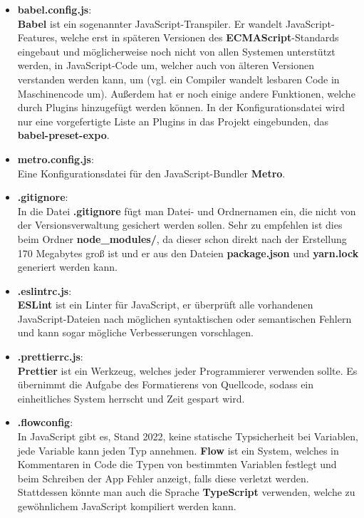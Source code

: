 \begin{itemize}
\item \textbf{babel.config.js}:\\
\textbf{Babel} ist ein sogenannter JavaScript-Transpiler. Er wandelt JavaScript-Features, welche erst in
späteren Versionen des \textbf{ECMAScript}-Standards eingebaut und möglicherweise noch nicht von allen
Systemen unterstützt werden, in JavaScript-Code um, welcher auch von älteren Versionen verstanden
werden kann, um (vgl. ein Compiler wandelt lesbaren Code in Maschinencode um). Außerdem hat er noch
einige andere Funktionen, welche durch Plugins hinzugefügt werden können. In der Konfigurationsdatei
wird nur eine vorgefertigte Liste an Plugins in das Projekt eingebunden, das \textbf{babel-preset-expo}.

\item \textbf{metro.config.js}:\\
Eine Konfigurationsdatei für den JavaScript-Bundler \textbf{Metro}.

\item \textbf{.gitignore}:\\
In die Datei \textbf{.gitignore} fügt man Datei- und Ordnernamen ein, die nicht von der Versionsverwaltung
gesichert werden sollen. Sehr zu empfehlen ist dies beim Ordner \textbf{node\_modules/}, da dieser schon
direkt nach der Erstellung 170 Megabytes groß ist und er aus den Dateien \textbf{package.json} und \textbf{yarn.lock}
generiert werden kann.

\item \textbf{.eslintrc.js}:\\
\textbf{ESLint} ist ein Linter für JavaScript, er überprüft alle vorhandenen JavaScript-Dateien nach
möglichen syntaktischen oder semantischen Fehlern und kann sogar mögliche Verbesserungen vorschlagen.

\item \textbf{.prettierrc.js}:\\
\textbf{Prettier} ist ein Werkzeug, welches jeder Programmierer verwenden sollte. Es übernimmt die Aufgabe
des Formatierens von Quellcode, sodass ein einheitliches System herrscht und Zeit gespart wird.

\item \textbf{.flowconfig}:\\
In JavaScript gibt es, Stand 2022, keine statische Typsicherheit bei Variablen, jede Variable kann
jeden Typ annehmen. \textbf{Flow} ist ein System, welches in Kommentaren in Code die Typen von bestimmten
Variablen festlegt und beim Schreiben der App Fehler anzeigt, falls diese verletzt werden.
Stattdessen könnte man auch die Sprache \textbf{TypeScript} verwenden, welche zu gewöhnlichem JavaScript
kompiliert werden kann.


\end{itemize}
